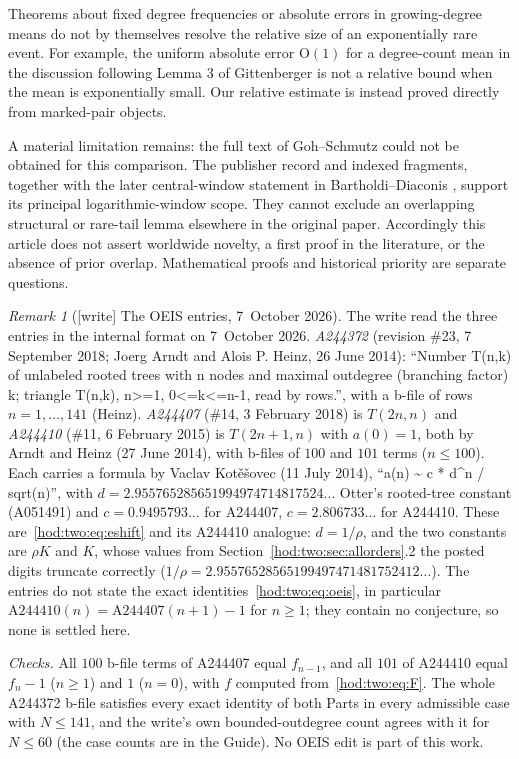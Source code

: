 \documentclass[11pt,letterpaper]{article}
\theoremstyle{definition}\newtheorem{definition}[theorem]{Definition}
\theoremstyle{remark}\newtheorem{remark}[theorem]{Remark}
\newcommand{\bigO}{\mathrm O}
\begin{document}
Theorems about fixed degree frequencies or absolute errors in growing-degree means do not by themselves resolve the relative size of an exponentially rare event. For example, the uniform absolute error $\bigO(1)$ for a degree-count mean in the discussion following Lemma 3 of Gittenberger \cite{gittenberger} is not a relative bound when the mean is exponentially small. Our relative estimate is instead proved directly from marked-pair objects.

A material limitation remains: the full text of Goh--Schmutz \cite{goh} could not be obtained for this comparison. The publisher record and indexed fragments, together with the later central-window statement in Bartholdi--Diaconis \cite{bd}, support its principal logarithmic-window scope. They cannot exclude an overlapping structural or rare-tail lemma elsewhere in the original paper. Accordingly this article does not assert worldwide novelty, a first proof in the literature, or the absence of prior overlap. Mathematical proofs and historical priority are separate questions.

\begin{remark}[{[write]} The OEIS entries, 7~October 2026]\label{hod:two:rem:oeis}
The write read the three entries in the internal format on 7~October 2026.
\emph{A244372} (revision \#23, 7 September 2018; Joerg Arndt and Alois P. Heinz, 26 June 2014): ``Number T(n,k) of unlabeled rooted trees with n nodes and maximal outdegree (branching factor) k; triangle T(n,k), n>=1, 0<=k<=n-1, read by rows.'', with a b-file of rows $n=1,\ldots,141$ (Heinz). \emph{A244407} (\#14, 3 February 2018) is $T(2n,n)$ and \emph{A244410} (\#11, 6 February 2015) is $T(2n+1,n)$ with $a(0)=1$, both by Arndt and Heinz (27 June 2014), with b-files of $100$ and $101$ terms ($n\le100$). Each carries a formula by Vaclav Kot\v{e}\v{s}ovec (11 July 2014), ``a(n) \textasciitilde{} c * d\textasciicircum n / sqrt(n)'', with $d=2.955765285651994974714817524\ldots$ Otter's rooted-tree constant (A051491) and $c=0.9495793\ldots$ for A244407, $c=2.806733\ldots$ for A244410. These are~\eqref{hod:two:eq:eshift} and its A244410 analogue: $d=1/\rho$, and the two constants are $\rho K$ and $K$, whose values from Section~\ref{hod:two:sec:allorders}.2 the posted digits truncate correctly ($1/\rho=2.95576528565199497471481752412\ldots$). The entries do not state the exact identities~\eqref{hod:two:eq:oeis}, in particular $\mathrm{A244410}(n)=\mathrm{A244407}(n+1)-1$ for $n\ge1$; they contain no conjecture, so none is settled here.

\emph{Checks.} All $100$ b-file terms of A244407 equal $f_{n-1}$, and all $101$ of A244410 equal $f_n-1$ ($n\ge1$) and $1$ ($n=0$), with $f$ computed from~\eqref{hod:two:eq:F}. The whole A244372 b-file satisfies every exact identity of both Parts in every admissible case with $N\le141$, and the write's own bounded-outdegree count agrees with it for $N\le60$ (the case counts are in the Guide). No OEIS edit is part of this work.
\end{remark}
\end{document}
